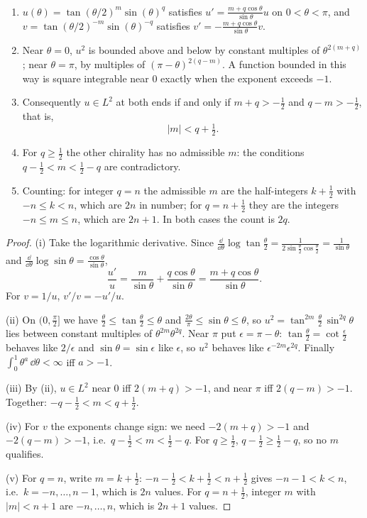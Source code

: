\begin{theorem}\label{thm:zeromodes}\ver\
\begin{enumerate}[label=(\roman*)]
\item $u(\theta)=\tan(\theta/2)^m\sin(\theta)^q$ satisfies $u'=\frac{m+q\cos\theta}{\sin\theta}u$ on $0<\theta<\pi$, and $v=\tan(\theta/2)^{-m}\sin(\theta)^{-q}$ satisfies $v'=-\frac{m+q\cos\theta}{\sin\theta}v$.
\item Near $\theta=0$, $u^2$ is bounded above and below by constant multiples of $\theta^{2(m+q)}$; near $\theta=\pi$, by multiples of $(\pi-\theta)^{2(q-m)}$. A function bounded in this way is square integrable near $0$ exactly when the exponent exceeds $-1$.
\item Consequently $u\in L^2$ at both ends if and only if $m+q>-\frac12$ and $q-m>-\frac12$, that is,
\[
|m|<q+\tfrac12 .
\]
\item For $q\ge\frac12$ the other chirality has no admissible $m$: the conditions $q-\frac12<m<\frac12-q$ are contradictory.
\item Counting: for integer $q=n$ the admissible $m$ are the half-integers $k+\frac12$ with $-n\le k<n$, which are $2n$ in number; for $q=n+\frac12$ they are the integers $-n\le m\le n$, which are $2n+1$. In both cases the count is $2q$.
\end{enumerate}
\end{theorem}
\begin{proof}
(i) Take the logarithmic derivative. Since $\frac{\dd}{\dd\theta}\log\tan\frac\theta2=\frac{1}{2\sin\frac\theta2\cos\frac\theta2}=\frac1{\sin\theta}$ and $\frac{\dd}{\dd\theta}\log\sin\theta=\frac{\cos\theta}{\sin\theta}$,
\[
\frac{u'}u=\frac m{\sin\theta}+\frac{q\cos\theta}{\sin\theta}=\frac{m+q\cos\theta}{\sin\theta}.
\]
For $v=1/u$, $v'/v=-u'/u$.

(ii) On $(0,\frac\pi2]$ we have $\frac\theta2\le\tan\frac\theta2\le\theta$ and $\frac{2\theta}\pi\le\sin\theta\le\theta$, so $u^2=\tan^{2m}\frac\theta2\,\sin^{2q}\theta$ lies between constant multiples of $\theta^{2m}\theta^{2q}$. Near $\pi$ put $\epsilon=\pi-\theta$: $\tan\frac\theta2=\cot\frac\epsilon2$ behaves like $2/\epsilon$ and $\sin\theta=\sin\epsilon$ like $\epsilon$, so $u^2$ behaves like $\epsilon^{-2m}\epsilon^{2q}$. Finally $\int_0^1\theta^a\,\dd\theta<\infty$ iff $a>-1$.

(iii) By (ii), $u\in L^2$ near $0$ iff $2(m+q)>-1$, and near $\pi$ iff $2(q-m)>-1$. Together: $-q-\frac12<m<q+\frac12$.

(iv) For $v$ the exponents change sign: we need $-2(m+q)>-1$ and $-2(q-m)>-1$, i.e.\ $q-\frac12<m<\frac12-q$. For $q\ge\frac12$, $q-\frac12\ge\frac12-q$, so no $m$ qualifies.

(v) For $q=n$, write $m=k+\frac12$: $-n-\frac12<k+\frac12<n+\frac12$ gives $-n-1<k<n$, i.e.\ $k=-n,\dots,n-1$, which is $2n$ values. For $q=n+\frac12$, integer $m$ with $|m|<n+1$ are $-n,\dots,n$, which is $2n+1$ values.
\end{proof}


